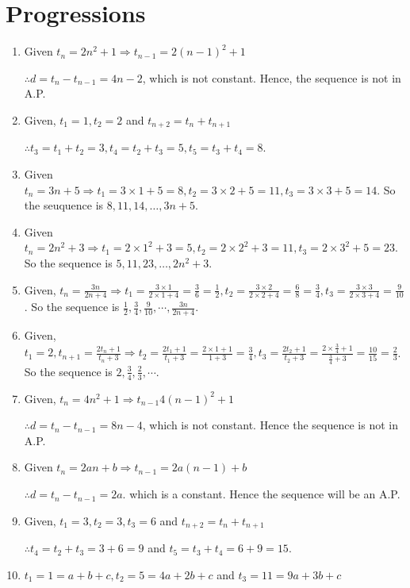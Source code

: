 \chapter{Progressions}
\begin{enumerate}
\item Given $t_n = 2n^2 + 1 \Rightarrow t_{n - 1} = 2(n - 1)^2 + 1$

  $\therefore d = t_n - t_{n - 1} = 4n - 2$, which is not constant. Hence, the sequence is not in A.P.
\item Given, $t_1 = 1, t_2 = 2$ and $t_{n+2} = t_n + t_{n + 1}$

  $\therefore t_3 = t_1 + t_2 = 3, t_4 = t_2 + t_3 = 5, t_5 = t_3 + t_4 = 8$.
\item Given $t_n = 3n + 5 \Rightarrow t_1 = 3\times1 + 5 = 8, t_2 = 3\times2 + 5 = 11, t_3 = 3\times3 + 5 = 14$. So the seuquence
  is $8, 11, 14, \ldots, 3n + 5$.
\item Given $t_n = 2n^2 + 3 \Rightarrow t_1 = 2\times1^2 + 3 = 5, t_2 = 2\times2^2 + 3 = 11, t_3 = 2\times3^2 + 5 = 23$. So the
  sequence is $5, 11, 23, \ldots, 2n^2 + 3$.
\item Given, $t_n = \frac{3n}{2n + 4}\Rightarrow t_1 = \frac{3\times1}{2\times1 + 4} = \frac{3}{6} = \frac{1}{2}, t_2 =
  \frac{3\times2}{2\times2 + 4} = \frac{6}{8} = \frac{3}{4}, t_3 = \frac{3\times3}{2\times3 + 4} = \frac{9}{10}$. So the
  sequence is $\frac{1}{2}, \frac{3}{4}, \frac{9}{10}, \cdots, \frac{3n}{2n + 4}$.
\item Given, $t_1 = 2, t_{n + 1} = \frac{2t_n + 1}{t_n + 3} \Rightarrow t_2 = \frac{2t_1 + 1}{t_1 + 3} = \frac{2\times1 + 1}{1 + 3}
  = \frac{3}{4}, t_3 = \frac{2t_2 + 1}{t_2 + 3} = \frac{2\times\tfrac{3}{4} + 1}{\tfrac{3}{4} + 3} = \frac{10}{15} = \frac{2}{3}$.
  So the sequence is $2, \frac{3}{4}, \frac{2}{3}, \cdots$.
\item Given, $t_n = 4n^2 + 1 \Rightarrow t_{n - 1} 4(n - 1)^2 + 1$

  $\therefore d = t_n - t_{n - 1} = 8n - 4$, which is not constant. Hence the sequence is not in A.P.
\item Given $t_n = 2an + b \Rightarrow t_{n - 1} = 2a(n - 1) + b$

  $\therefore d = t_n - t_{n - 1} = 2a$. which is a constant. Hence the sequence will be an A.P.
\item Given, $t_1 = 3, t_2 = 3, t_3 = 6$ and $t_{n + 2} = t_n + t_{n + 1}$

  $\therefore t_4 = t_2 + t_3 = 3 + 6 = 9$ and $t_5 = t_3 + t_4 = 6 + 9 = 15$.
\item $t_1 = 1 = a + b + c, t_2 = 5 = 4a + 2b + c$ and $t_3 = 11 = 9a + 3b + c$


\end{enumerate}
